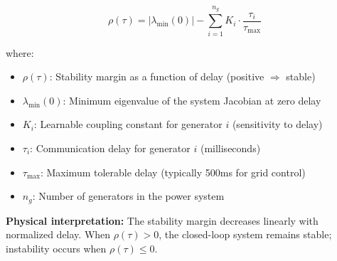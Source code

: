 


\begin{equation}
\label{eq:stability_margin}
\rho(\tau) = |\lambda_{\min}(0)| - \sum_{i=1}^{n_g} K_i \cdot \frac{\tau_i}{\tau_{\max}}
\end{equation}

\noindent where:
\begin{itemize}
    \item $\rho(\tau)$: Stability margin as a function of delay (positive $\Rightarrow$ stable)
    \item $\lambda_{\min}(0)$: Minimum eigenvalue of the system Jacobian at zero delay
    \item $K_i$: Learnable coupling constant for generator $i$ (sensitivity to delay)
    \item $\tau_i$: Communication delay for generator $i$ (milliseconds)
    \item $\tau_{\max}$: Maximum tolerable delay (typically 500ms for grid control)
    \item $n_g$: Number of generators in the power system
\end{itemize}

\textbf{Physical interpretation:} The stability margin decreases linearly with normalized delay. When $\rho(\tau) > 0$, the closed-loop system remains stable; instability occurs when $\rho(\tau) \leq 0$.


